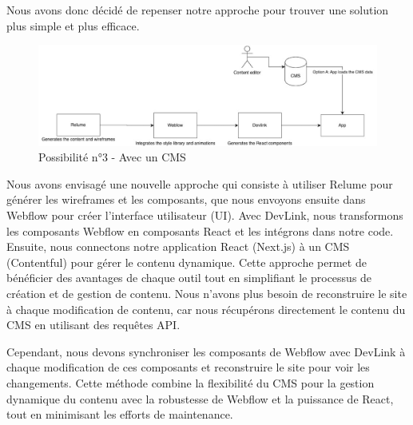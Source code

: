 Nous avons donc décidé de repenser notre approche pour trouver une solution plus simple et plus efficace. 

\begin{figure}[h] 
  \centering
  \includegraphics[width=1\textwidth]{Includes/Images/connection4.png}
  \caption{Possibilité n°3 - Avec un CMS}
  \label{fig: Possibilité n°2 - Avec un CMS}
\end{figure} 

Nous avons envisagé une nouvelle approche qui consiste à utiliser Relume pour générer les wireframes et les composants, que nous envoyons ensuite dans Webflow pour créer l'interface utilisateur (UI). Avec DevLink, nous transformons les composants Webflow en composants React et les intégrons dans notre code. Ensuite, nous connectons notre application React (Next.js) à un CMS (Contentful) pour gérer le contenu dynamique. Cette approche permet de bénéficier des avantages de chaque outil tout en simplifiant le processus de création et de gestion de contenu. Nous n'avons plus besoin de reconstruire le site à chaque modification de contenu, car nous récupérons directement le contenu du CMS en utilisant des requêtes API.

Cependant, nous devons synchroniser les composants de Webflow avec DevLink à chaque modification de ces composants et reconstruire le site pour voir les changements. Cette méthode combine la flexibilité du CMS pour la gestion dynamique du contenu avec la robustesse de Webflow et la puissance de React, tout en minimisant les efforts de maintenance.

